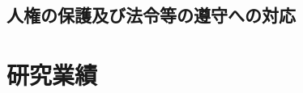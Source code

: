 \documentclass[11pt,a4paper,twoside,dvipdfmx]{jarticle}		%
\def\rem#1{ {\bf\textcolor{red}{($\clubsuit$ #1 $\clubsuit$)}}}
\newcommand{\研究課題名}{粒子加速器を用いた電弱相互作用を持つ新物理の探索}
\newcommand{\研究機関名}{東京大学}
\newcommand{\申請者氏名}{千草颯}
\newcommand{\研究代表者氏名}{\申請者氏名}
\newcommand{\研究期間の最終元号年度}{34}	%
\begin{document}
\subsection{人権の保護及び法令等の遵守への対応}
\newcommand{\受け入れ研究室の選定理由}{%

■ \pmb{\ul{知るきっかけ、打ち合わせ状況}}

\vspace*{1mm}

受入研究者である遠藤准教授は超対称模型や暗黒物質、有効理論を用いた精密
計算など、幅広い分野に渡って精力的に研究を行なっている研究者である。同
時に遠藤氏は、近年における電弱真空崩壊率の精密計算の第一人者でもある。
申請者が研究を行う際、これらの研究を参考としたことが、知るきっかけであ
る。また申請者はKEKで自身の研究に関するセミナーを行い、その際遠藤氏と
研究内容について議論した。その他研究会等においても遠藤氏との議論の経験
があるため、共同研究は支障なく行えると考えられる。

\vspace*{1mm}

■ \pmb{\ul{メリット、新たな発展・展開}}

\vspace*{1mm}

上記の通り遠藤氏は超対称模型や暗黒物質、有効理論を用いた計算、電弱真空
崩壊率の計算などに関して幅広い知識を持っている。\rem{Stop}

}

\newcommand{\人権の保護及び法令等の遵守への対応}{%

該当しない。

}

\section{研究業績}
\end{document}
